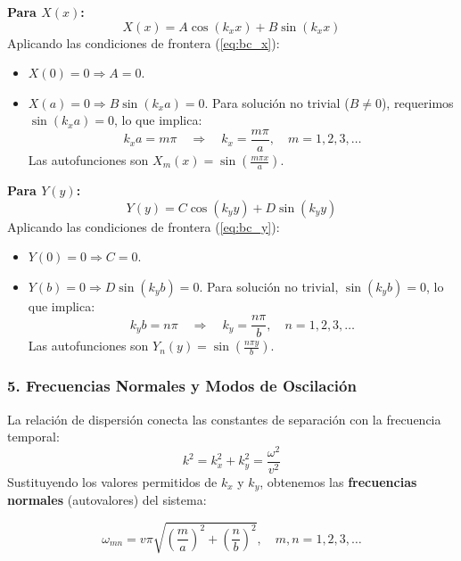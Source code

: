 \documentclass[a4paper]{article}
\begin{document}
\textbf{Para $X(x)$:}
\begin{equation}
X(x) = A \cos(k_x x) + B \sin(k_x x)
\end{equation}
Aplicando las condiciones de frontera (\ref{eq:bc_x}):
\begin{itemize}
    \item $X(0) = 0 \Rightarrow A = 0$.
    \item $X(a) = 0 \Rightarrow B \sin(k_x a) = 0$. Para solución no trivial ($B \neq 0$), requerimos $\sin(k_x a) = 0$, lo que implica:
    \begin{equation}
    k_x a = m \pi \quad \Rightarrow \quad k_x = \frac{m \pi}{a}, \quad m = 1, 2, 3, \dots
    \end{equation}
    Las autofunciones son $X_m(x) = \sin\left(\frac{m \pi x}{a}\right)$.
\end{itemize}

\textbf{Para $Y(y)$:}
\begin{equation}
Y(y) = C \cos(k_y y) + D \sin(k_y y)
\end{equation}
Aplicando las condiciones de frontera (\ref{eq:bc_y}):
\begin{itemize}
    \item $Y(0) = 0 \Rightarrow C = 0$.
    \item $Y(b) = 0 \Rightarrow D \sin(k_y b) = 0$. Para solución no trivial, $\sin(k_y b) = 0$, lo que implica:
    \begin{equation}
    k_y b = n \pi \quad \Rightarrow \quad k_y = \frac{n \pi}{b}, \quad n = 1, 2, 3, \dots
    \end{equation}
    Las autofunciones son $Y_n(y) = \sin\left(\frac{n \pi y}{b}\right)$.
\end{itemize}

\subsubsection{5. Frecuencias Normales y Modos de Oscilación}

La relación de dispersión conecta las constantes de separación con la frecuencia temporal:
\begin{equation}
k^2 = k_x^2 + k_y^2 = \frac{\omega^2}{v^2}
\end{equation}
Sustituyendo los valores permitidos de $k_x$ y $k_y$, obtenemos las \textbf{frecuencias normales} (autovalores) del sistema:

\begin{equation}
\omega_{mn} = v \pi \sqrt{\left(\frac{m}{a}\right)^2 + \left(\frac{n}{b}\right)^2}, \quad m, n = 1, 2, 3, \dots
\end{equation}
\end{document}
